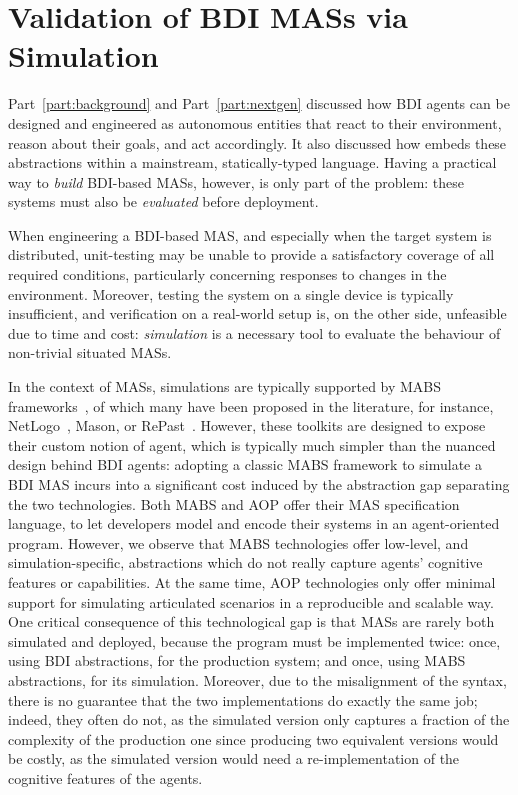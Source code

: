 \chapter{Validation of \acs{BDI} \acsp{MAS} via Simulation}
\label{chap:simulation}

Part~\ref{part:background} and Part~\ref{part:nextgen} discussed how \ac{BDI} agents can be designed and engineered
as autonomous entities that react to their environment, reason about their goals, and act accordingly.
%
It also discussed how \jakta{} embeds these abstractions within a mainstream, statically-typed language.
%
Having a practical way to \emph{build} \ac{BDI}-based \acp{MAS}, however, is only part of the problem:
these systems must also be \emph{evaluated} before deployment.

When engineering a \ac{BDI}-based \ac{MAS},
and especially when the target system is distributed,
unit-testing may be unable to provide a satisfactory coverage of all required conditions,
particularly concerning responses to changes in the environment.
%
Moreover, testing the system on a single device is typically insufficient,
and verification on a real-world setup is, on the other side,
unfeasible due to time and cost:
\emph{simulation} is a necessary tool
to evaluate the behaviour of non-trivial situated \acp{MAS}. 
%

In the context of \acp{MAS},
simulations are typically supported by \ac{MABS} frameworks~\cite{DrogoulVM02,BandiniMV09},
of which many have been proposed in the literature,
for instance, NetLogo~\cite{Sklar07}, Mason\cite{LukeCPSB05}, or RePast~\cite{NorthCOTMBS13}.
%
However, these toolkits are designed to expose their custom notion of agent,
which is typically much simpler than the nuanced design behind \ac{BDI} agents:
adopting a classic \ac{MABS} framework
to simulate a \ac{BDI} \ac{MAS}
incurs into a significant cost induced by the abstraction gap
separating the two technologies.
%
Both \ac{MABS} and \ac{AOP} offer their \ac{MAS} specification language,
to let developers model and encode their systems in an agent-oriented program.
However,
we observe that \ac{MABS} technologies offer low-level, and simulation-specific, abstractions
which do not really capture agents' cognitive features or capabilities.
At the same time,
\ac{AOP} technologies only offer minimal support for simulating articulated scenarios
in a reproducible and scalable way.
%
One critical consequence of this technological gap is that \acp{MAS} are rarely both simulated and deployed,
because the program must be implemented twice:
once, using \ac{BDI} abstractions, for the production system;
and once, using \ac{MABS} abstractions, for its simulation.
%
Moreover, due to the misalignment of the syntax,
there is no guarantee that the two implementations do exactly the same job;
indeed, they often do not,
as the simulated version only captures a fraction of the complexity of the production one since
producing two equivalent versions would be costly,
as the simulated version would need a re-implementation of the cognitive features of the agents.

